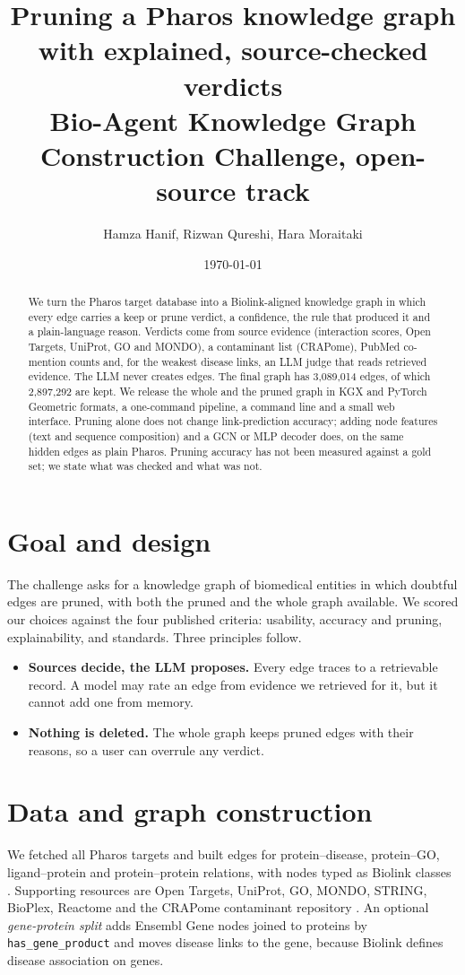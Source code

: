 \documentclass[11pt]{article}
\title{Pruning a Pharos knowledge graph with explained, source-checked verdicts\\\large Bio-Agent Knowledge Graph Construction Challenge, open-source track}
\author{Hamza Hanif, Rizwan Qureshi, Hara Moraitaki}
\date{\today}
\begin{document}
\maketitle

\begin{abstract}
We turn the Pharos target database into a Biolink-aligned knowledge graph in which every edge carries a keep or prune verdict, a confidence, the rule that produced it and a plain-language reason. Verdicts come from source evidence (interaction scores, Open Targets, UniProt, GO and MONDO), a contaminant list (CRAPome), PubMed co-mention counts and, for the weakest disease links, an LLM judge that reads retrieved evidence. The LLM never creates edges. The final graph has 3,089,014 edges, of which 2,897,292 are kept. We release the whole and the pruned graph in KGX and PyTorch Geometric formats, a one-command pipeline, a command line and a small web interface. Pruning alone does not change link-prediction accuracy; adding node features (text and sequence composition) and a GCN or MLP decoder does, on the same hidden edges as plain Pharos. Pruning accuracy has not been measured against a gold set; we state what was checked and what was not.
\end{abstract}

\section{Goal and design}
The challenge asks for a knowledge graph of biomedical entities in which doubtful edges are pruned, with both the pruned and the whole graph available. We scored our choices against the four published criteria: usability, accuracy and pruning, explainability, and standards. Three principles follow.
\begin{itemize}
\item \textbf{Sources decide, the LLM proposes.} Every edge traces to a retrievable record. A model may rate an edge from evidence we retrieved for it, but it cannot add one from memory.
\item \textbf{Nothing is deleted.} The whole graph keeps pruned edges with their reasons, so a user can overrule any verdict.
\end{itemize}

\section{Data and graph construction}
We fetched all Pharos targets \cite{pharos} and built edges for protein--disease, protein--GO, ligand--protein and protein--protein relations, with nodes typed as Biolink classes \cite{biolink}. Supporting resources are Open Targets, UniProt, GO, MONDO, STRING, BioPlex, Reactome and the CRAPome contaminant repository \cite{crapome}. An optional \emph{gene-protein split} adds Ensembl Gene nodes joined to proteins by \texttt{has\_gene\_product} and moves disease links to the gene, because Biolink defines disease association on genes.
\end{document}
